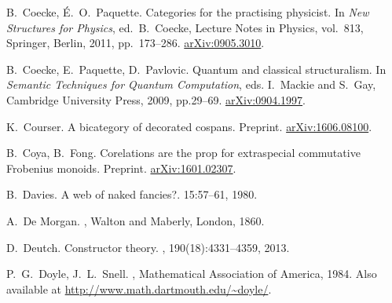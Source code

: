\begin{thebibliography}{RSW00}
    B.\ Coecke, \'E.\ O.\ Paquette.
    \newblock Categories for the practising physicist.
    \newblock In {\sl New Structures for Physics}, ed.\ B.\ Coecke,  
    Lecture Notes in Physics, vol.\ 813, Springer, Berlin, 2011, pp.\ 173--286.
    \newblock \href{http://arxiv.org/abs/0905.3010}{arXiv:0905.3010}.

    B.\ Coecke, E.\ Paquette, D.\ Pavlovic.
    \newblock Quantum and classical structuralism.
    \newblock In \textsl{Semantic Techniques for Quantum
    Computation}, eds. I.\ Mackie and S.\ Gay, Cambridge University Press, 2009,
    pp.29--69.
    \newblock \href{http://arxiv.org/abs/0904.1997}{arXiv:0904.1997}.

    K.\ Courser.
    \newblock A bicategory of decorated cospans.
    \newblock Preprint. 
    \newblock \href{http://arxiv.org/abs/1606.08100}{arXiv:1606.08100}.

    B.\ Coya, B.\ Fong.
    \newblock Corelations are the prop for extraspecial commutative Frobenius
    monoids.
    \newblock Preprint.
    \newblock \href{http://arxiv.org/abs/1601.02307}{arXiv:1601.02307}.

    B.\ Davies.
    \newblock A web of naked fancies?.
     { 15}:57--61, 1980.
    
    A.\ De Morgan.
    , Walton and Maberly,
    London, 1860.

    D.\ Deutch.
    \newblock Constructor theory.
    , 190(18):4331--4359, 2013.
    


    P.\ G.\ Doyle, J.\ L.\ Snell.
    , Mathematical Association of America, 1984.
    \newblock Also available at \href{http://www.math.dartmouth.edu/~doyle/}
    {http://www.math.dartmouth.edu/\~{}doyle/}.



\end{thebibliography}
